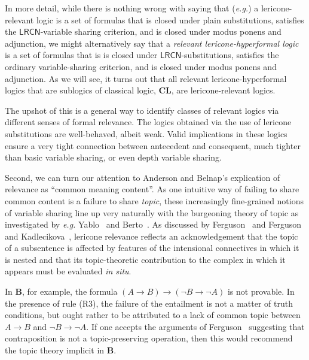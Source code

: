 \documentclass{amsart}
\theoremstyle{definition}
\newcommand{\LRCN}{\mathsf{LRCN}}
\newcommand{\logic}[1]{{\ensuremath {\mathbf{#1}}}}
\begin{document}
In more detail, while there is nothing wrong with saying that (\emph{e.g.}) a lericone-relevant logic is a set of formulas that is closed under plain substitutions, satisfies the $\LRCN$-variable sharing criterion, and is closed under modus ponens and adjunction, we might alternatively say that a \emph{relevant lericone-hyperformal logic} is a set of formulas that is is closed under $\LRCN$-substitutions, satisfies the ordinary variable-sharing criterion, and is closed under modus ponens and adjunction. As we will see, it turns out that all relevant lericone-hyperformal logics that are sublogics of classical logic, \logic{CL}, are lericone-relevant logics.

The upshot of this is a general way to identify classes of relevant logics via different senses of formal relevance. 
The logics obtained via the use of lericone substitutions are well-behaved, albeit weak. Valid implications in these logics ensure a very tight connection between antecedent and consequent, much tighter than basic variable sharing, or even depth variable sharing. 

Second, we can turn our attention to Anderson and Belnap's \citeyearpar[p.~33]{anderson1975} explication of relevance as ``common meaning content''. As one intuitive way of failing to share common content is a failure to share \emph{topic}, these increasingly fine-grained notions of variable sharing line up very naturally with the burgeoning theory of topic as investigated by \emph{e.g.} Yablo~\citeyearpar{yablo2014} and Berto~\citeyearpar{berto2022}. As discussed by Ferguson~\citeyearpar{ferguson2024} and Ferguson and Kadlecikova~\citeyearpar{fergusonkadlecikova2024}, lericone relevance reflects an acknowledgement that the topic of a subsentence is affected by features of the intensional connectives in which it is nested and that its topic-theoretic contribution to the complex in which it appears must be evaluated \emph{in situ}.

In $\mathbf{B}$, for example, the formula $(A\rightarrow B)\rightarrow(\neg B\rightarrow\neg A)$ is not provable. In the presence of rule (R3), the failure of the entailment is not a matter of truth conditions, but ought rather to be attributed to a lack of common topic between $A\rightarrow B$ and $\neg B\rightarrow\neg A$. If one accepts the arguments of Ferguson~\citeyearpar{ferguson2023d,ferguson2023e} suggesting that contraposition is not a topic-preserving operation, then this would recommend the topic theory implicit in $\mathbf{B}$.
\end{document}
